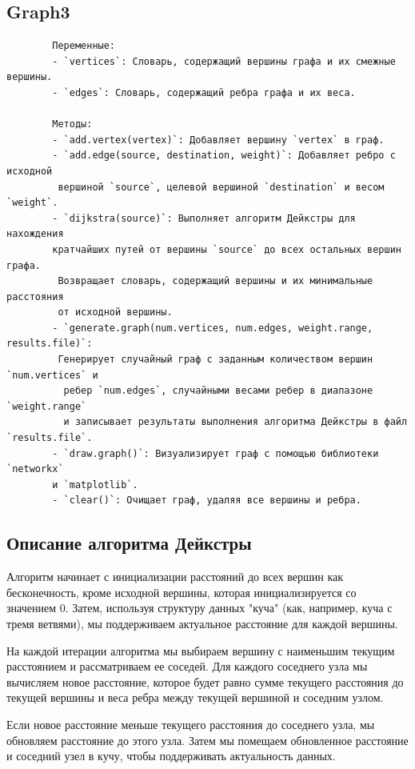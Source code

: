 \documentclass[a4paper, 12pt]{article}
\theoremstyle{definition}
\begin{document}
	\subsection{Graph3}
	\begin{verbatim}
		Переменные:
		- `vertices`: Словарь, содержащий вершины графа и их смежные вершины.
		- `edges`: Словарь, содержащий ребра графа и их веса.
		
		Методы:
		- `add.vertex(vertex)`: Добавляет вершину `vertex` в граф.
		- `add.edge(source, destination, weight)`: Добавляет ребро с исходной
		 вершиной `source`, целевой вершиной `destination` и весом `weight`.
		- `dijkstra(source)`: Выполняет алгоритм Дейкстры для нахождения 
		кратчайших путей от вершины `source` до всех остальных вершин графа.
		 Возвращает словарь, содержащий вершины и их минимальные расстояния 
		 от исходной вершины.
		- `generate.graph(num.vertices, num.edges, weight.range, results.file)`:
		 Генерирует случайный граф с заданным количеством вершин `num.vertices` и
		  ребер `num.edges`, случайными весами ребер в диапазоне `weight.range` 
		  и записывает результаты выполнения алгоритма Дейкстры в файл `results.file`.
		- `draw.graph()`: Визуализирует граф с помощью библиотеки `networkx`
		и `matplotlib`.
		- `clear()`: Очищает граф, удаляя все вершины и ребра.
	\end{verbatim}
	\subsection{Описание алгоритма Дейкстры}
	
		Алгоритм начинает с инициализации расстояний до всех вершин как бесконечность, кроме исходной вершины, которая инициализируется со значением 0. Затем, используя структуру данных "куча" (как, например, куча с тремя ветвями), мы поддерживаем актуальное расстояние для каждой вершины. \newline
		
		На каждой итерации алгоритма мы выбираем вершину с наименьшим текущим расстоянием и рассматриваем ее соседей. Для каждого соседнего узла мы вычисляем новое расстояние, которое будет равно сумме текущего расстояния до текущей вершины и веса ребра между текущей вершиной и соседним узлом.\newline
		
		Если новое расстояние меньше текущего расстояния до соседнего узла, мы обновляем расстояние до этого узла. Затем мы помещаем обновленное расстояние и соседний узел в кучу, чтобы поддерживать актуальность данных.\newline
		
\end{document}
